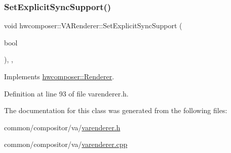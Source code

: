 \subsubsection{\texorpdfstring{Set\+Explicit\+Sync\+Support()}{SetExplicitSyncSupport()}}
{\footnotesize\ttfamily void hwcomposer\+::\+V\+A\+Renderer\+::\+Set\+Explicit\+Sync\+Support (\begin{DoxyParamCaption}\item[{bool}]{ }\end{DoxyParamCaption})\hspace{0.3cm}{\ttfamily [inline]}, {\ttfamily [override]}, {\ttfamily [virtual]}}



Implements \mbox{\hyperlink{classhwcomposer_1_1Renderer_a8f889bf7b26aa7d1436e9ecf6d15e629}{hwcomposer\+::\+Renderer}}.



Definition at line 93 of file varenderer.\+h.


\begin{DoxyCode}{0}
\end{DoxyCode}


The documentation for this class was generated from the following files\+:\begin{DoxyCompactItemize}
\item 
common/compositor/va/\mbox{\hyperlink{varenderer_8h}{varenderer.\+h}}\item 
common/compositor/va/\mbox{\hyperlink{varenderer_8cpp}{varenderer.\+cpp}}\end{DoxyCompactItemize}
